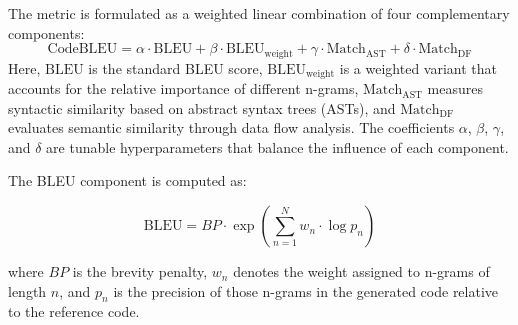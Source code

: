 The metric is formulated as a weighted linear combination of four complementary components:
\begin{equation}
    \text{CodeBLEU} = \alpha \cdot \text{BLEU} + \beta \cdot \text{BLEU}_{\text{weight}} + \gamma \cdot \text{Match}_{\text{AST}} + \delta \cdot \text{Match}_{\text{DF}}
\end{equation}
Here, \(\text{BLEU}\) is the standard BLEU score, \(\text{BLEU}_{\text{weight}}\) is a weighted variant that accounts for the relative importance of different n-grams, \(\text{Match}_{\text{AST}}\) measures syntactic similarity based on abstract syntax trees (ASTs), and \(\text{Match}_{\text{DF}}\) evaluates semantic similarity through data flow analysis. The coefficients \(\alpha\), \(\beta\), \(\gamma\), and \(\delta\) are tunable hyperparameters that balance the influence of each component.

The BLEU component is computed as:

\begin{equation}
    \text{BLEU} = BP \cdot \exp\left(\sum_{n=1}^{N} w_n \cdot \log p_n\right)
\end{equation}

where \(BP\) is the brevity penalty, \(w_n\) denotes the weight assigned to n-grams of length \(n\), and \(p_n\) is the precision of those n-grams in the generated code relative to the reference code.










